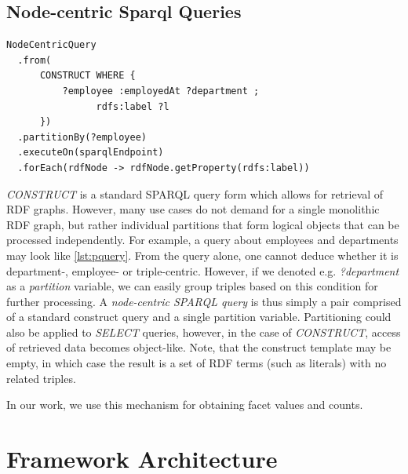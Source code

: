 
\subsection{Node-centric Sparql Queries}
\begin{lstlisting}[language=sparql, label=lst:pquery, caption=Pseudo code for a node-centric query and property access]
NodeCentricQuery
  .from(
      CONSTRUCT WHERE {
          ?employee :employedAt ?department ;
                rdfs:label ?l
      })
  .partitionBy(?employee)
  .executeOn(sparqlEndpoint)
  .forEach(rdfNode -> rdfNode.getProperty(rdfs:label))
\end{lstlisting}
\emph{CONSTRUCT} is a standard SPARQL query form which allows for retrieval of RDF graphs. However, many use cases do not demand for a single monolithic RDF graph,
but rather individual partitions that form logical objects that can be processed independently.
For example, a query about employees and departments may look like \autoref{lst:pquery}.
From the query alone, one cannot deduce whether it is department-, employee- or triple-centric.
However, if we denoted e.g. \emph{?department} as a \emph{partition} variable, we can easily group triples
based on this condition for further processing.
A \emph{node-centric SPARQL query} is thus simply a pair comprised of a standard construct query and a single partition variable.
Partitioning could also be applied to \emph{SELECT} queries, however, in the case of \emph{CONSTRUCT}, access of retrieved data becomes object-like. %
Note, that the construct template may be empty, in which case the result is a set of RDF terms (such as literals) with no related triples.

In our work, we use this mechanism for obtaining facet values and counts.

\section{Framework Architecture}
\label{sec:architecture}

